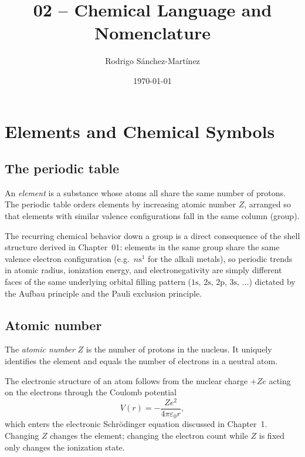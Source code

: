 \documentclass[11pt]{article}
\title{\textbf{02 -- Chemical Language and Nomenclature}}
\author{Rodrigo Sánchez-Martínez}
\date{\today}
\numberwithin{equation}{section}
\numberwithin{figure}{section}
\begin{document}
	
\maketitle	
	
\tableofcontents

\section{Elements and Chemical Symbols}

	\subsection{The periodic table}

	\begin{concept}
		An \emph{element} is a substance whose atoms all share the same number of protons.
		The periodic table orders elements by increasing atomic number $Z$, arranged so that elements with similar valence configurations fall in the same column (group).
	\end{concept}

	\begin{phys-note}
		The recurring chemical behavior down a group is a direct consequence of the shell structure derived in Chapter~01:
		elements in the same group share the same valence electron configuration (e.g.\ $n\mathrm{s^1}$ for the alkali metals), so periodic trends in atomic radius, ionization energy, and electronegativity are simply different faces of the same underlying orbital filling pattern ($\mathrm{1s},\,\mathrm{2s},\,\mathrm{2p},\,\mathrm{3s},\,\dots$) dictated by the Aufbau principle and the Pauli exclusion principle.
	\end{phys-note}
	
	\subsection{Atomic number}

	\begin{concept}
		The \emph{atomic number} $Z$ is the number of protons in the nucleus.
		It uniquely identifies the element and equals the number of electrons in a neutral atom.
	\end{concept}

	\begin{phys-note}
		The electronic structure of an atom follows from the nuclear charge $+Ze$ acting on the electrons through the Coulomb potential
		\begin{equation}
			V(r) = -\frac{Ze^{2}}{4\pi\varepsilon_0 r},
		\end{equation}
		which enters the electronic Schrödinger equation discussed in Chapter~1.
		Changing $Z$ changes the element; changing the electron count while $Z$ is fixed only changes the ionization state.
	\end{phys-note}
	
\end{document}
